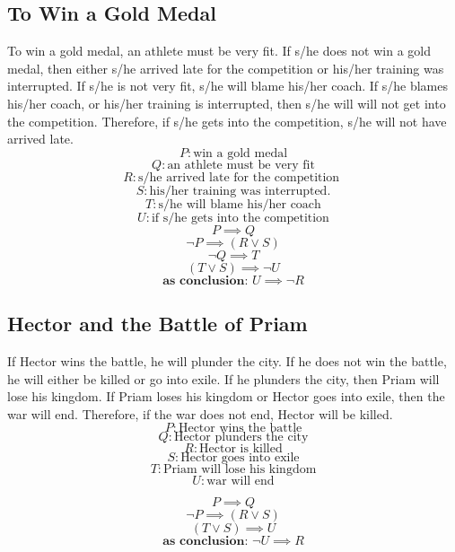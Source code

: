\documentclass[a4paper,12pt]{article}
\begin{document}
\subsection{To Win a Gold Medal}
To win a gold medal, an athlete must be very fit.  If s/he does not win a gold medal, then either s/he arrived late for the competition or his/her training was interrupted.  If s/he is not very fit, s/he will blame his/her coach.  If s/he blames his/her coach, or his/her training is interrupted, then s/he will will not get into the competition.  Therefore, if s/he gets into the competition, s/he will not have arrived late.
\[
P: \text{win a gold medal} 
\]
\[
Q: \text{an athlete must be very fit} 
\]
\[
R: \text{s/he arrived late for the competition } 
\]
\[
S: \text{his/her training was interrupted.} 
\]
\[
T: \text{s/he will blame his/her coach}
\]
\[
U: \text{if s/he gets into the competition}
\]
\begin{equation} 
P \implies Q 
\end{equation}
\begin{equation} 
\neg P \implies (R \vee S)
\end{equation}
\begin{equation} 
\neg Q \implies T
\end{equation}
\begin{equation} 
(T \vee S ) \implies \neg U
\end{equation}
\begin{equation} 
\textbf{as conclusion: } U \implies \neg R
\end{equation}

\subsection{Hector and the Battle of Priam}

If Hector wins the battle, he will plunder the city.  If he does not win the battle, he will either be killed or go into exile.  If he plunders the city, then Priam will lose his kingdom.  If Priam loses his kingdom or Hector goes into exile, then the war will end.  Therefore, if the war does not end, Hector will be killed. 
\[
P: \text{Hector wins the battle} 
\]
\[
Q: \text{Hector plunders the city} 
\]
\[
R: \text{Hector is killed} 
\]
\[
S: \text{Hector goes into exile}
\]
\[
T: \text{Priam will lose his kingdom}
\]
\[
U: \text{war will end}
\]

\begin{equation} 
P \implies Q 
\end{equation}
\begin{equation} 
\neg P \implies (R \vee S)
\end{equation}
\begin{equation} 
(T \vee S) \implies U
\end{equation}
\begin{equation} 
\textbf{as conclusion: } \neg U \implies R
\end{equation}
\end{document}
